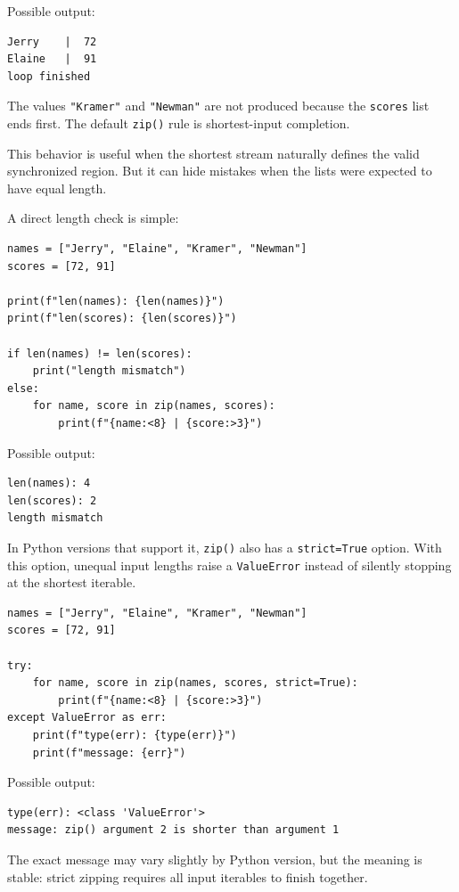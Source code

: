 Possible output:

\begin{verbatim}
Jerry    |  72
Elaine   |  91
loop finished
\end{verbatim}

The values \texttt{"Kramer"} and \texttt{"Newman"} are not produced because the \texttt{scores} list ends first. The default \texttt{zip()} rule is shortest-input completion.

This behavior is useful when the shortest stream naturally defines the valid synchronized region. But it can hide mistakes when the lists were expected to have equal length.

A direct length check is simple:

\begin{verbatim}
names = ["Jerry", "Elaine", "Kramer", "Newman"]
scores = [72, 91]

print(f"len(names): {len(names)}")
print(f"len(scores): {len(scores)}")

if len(names) != len(scores):
    print("length mismatch")
else:
    for name, score in zip(names, scores):
        print(f"{name:<8} | {score:>3}")
\end{verbatim}

Possible output:

\begin{verbatim}
len(names): 4
len(scores): 2
length mismatch
\end{verbatim}

In Python versions that support it, \texttt{zip()} also has a \texttt{strict=True} option. With this option, unequal input lengths raise a \texttt{ValueError} instead of silently stopping at the shortest iterable.

\begin{verbatim}
names = ["Jerry", "Elaine", "Kramer", "Newman"]
scores = [72, 91]

try:
    for name, score in zip(names, scores, strict=True):
        print(f"{name:<8} | {score:>3}")
except ValueError as err:
    print(f"type(err): {type(err)}")
    print(f"message: {err}")
\end{verbatim}

Possible output:

\begin{verbatim}
type(err): <class 'ValueError'>
message: zip() argument 2 is shorter than argument 1
\end{verbatim}

The exact message may vary slightly by Python version, but the meaning is stable: strict zipping requires all input iterables to finish together.

